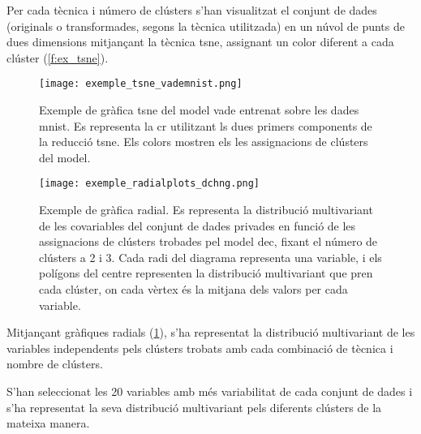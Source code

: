\documentclass[CAT,BIB]{TFUOC}%
\begin{document}
        Per cada tècnica i número de clústers
        s'han visualitzat el conjunt de dades
        (originals o transformades, segons la tècnica utilitzada)
        en un núvol de punts de dues dimensions
        mitjançant la tècnica \gls{tsne},
        assignant un color diferent a cada clúster (\cref{f:ex_tsne}).

        \begin{figure}
        \begin{minipage}[c]{0.48\textwidth}
            \centering
            \texttt{[image: exemple\_tsne\_vademnist.png]}
            \caption[Exemple gràfica \gls{tsne}]{
                Exemple de gràfica \gls{tsne}
                del model \gls{vade} entrenat sobre les dades \gls{mnist}.
                Es representa la \gls{cr} utilitzant ls dues primers components
                de la reducció \gls{tsne}.
                Els colors mostren els les assignacions de clústers del model.
            }
            \label{f:ex_tsne}
        \end{minipage} \hfill
        \begin{minipage}[c]{0.48\textwidth}
            \centering
            \texttt{[image: exemple\_radialplots\_dchng.png]}
            \caption[Exemple gràfica radial]{
                Exemple de gràfica radial.
                Es representa la distribució multivariant de les covariables
                del conjunt de dades \gls{privades}
                en funció de les assignacions de clústers
                trobades pel model \gls{dec},
                fixant el número de clústers a 2 i 3.
                Cada radi del diagrama representa una variable,
                i els polígons del centre representen la distribució multivariant que pren cada clúster,
                on cada vèrtex és la mitjana dels valors per cada variable.
            }
            \label{f:ex_radial}
        \end{minipage}
        \end{figure}

        Mitjançant gràfiques radials  (\cref{f:ex_radial}),
        s'ha representat la distribució multivariant
        de les variables independents
        pels clústers trobats amb cada combinació de tècnica i nombre de clústers.

        S'han seleccionat les 20 variables amb més variabilitat de cada conjunt de dades
        i s'ha representat la seva distribució multivariant
        pels diferents clústers de la mateixa manera.
\end{document}
